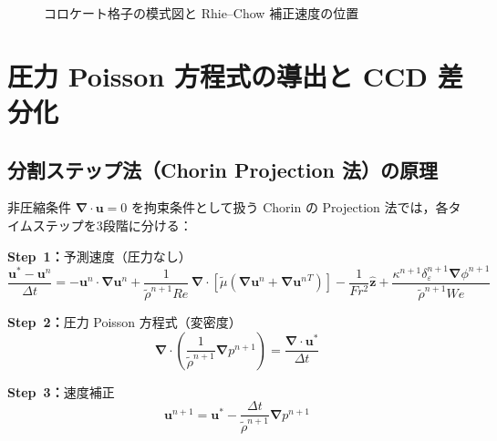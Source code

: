 \documentclass[12pt, a4paper, titlepage]{article}
\newcommand{\jp}[1]{{\normalfont\jpfont #1}}
\newcommand{\bu}{\bm{u}}
\newcommand{\bnabla}{\bm{\nabla}}
\newcommand{\de}{\delta_\varepsilon}
\begin{document}
\begin{figure}[h]
\centering
{}
\caption{\jp{コロケート格子の模式図と Rhie--Chow 補正速度の位置}}
\label{fig:collocate}
\end{figure}


\section{\jp{圧力 Poisson 方程式の導出と CCD 差分化}}
\label{sec:pressure}

\subsection{\jp{分割ステップ法（Chorin Projection 法）の原理}}

\jp{非圧縮条件 $\bnabla\cdot\bu = 0$ を拘束条件として扱う Chorin \cite{Chorin1968} の
Projection 法では，各タイムステップを3段階に分ける：}

\begin{tcolorbox}[algbox, title={\jp{Projection 法の3段階}}]
\textbf{Step~1\jp{：}}\jp{予測速度（圧力なし）}
\begin{equation}
  \frac{\bu^* - \bu^n}{\Delta t}
  = -\bu^n\cdot\bnabla\bu^n
  + \frac{1}{\tilde{\rho}^{n+1} Re}\,\bnabla\cdot\!\left[\tilde{\mu}\!\left(\bnabla\bu^n + \bnabla{\bu^n}^T\right)\right]
  - \frac{1}{Fr^2}\hat{\bm{z}}
  + \frac{\kappa^{n+1}\de^{n+1}\bnabla\phi^{n+1}}{\tilde{\rho}^{n+1} We}
  \label{eq:predictor}
\end{equation}

\textbf{Step~2\jp{：}}\jp{圧力 Poisson 方程式（変密度）}
\begin{equation}
  \bnabla\cdot\!\left(\frac{1}{\tilde{\rho}^{n+1}}\bnabla p^{n+1}\right)
  = \frac{\bnabla\cdot\bu^*}{\Delta t}
  \label{eq:PPE_operator}
\end{equation}

\textbf{Step~3\jp{：}}\jp{速度補正}
\begin{equation}
  \bu^{n+1} = \bu^* - \frac{\Delta t}{\tilde{\rho}^{n+1}}\bnabla p^{n+1}
  \label{eq:corrector}
\end{equation}
\end{tcolorbox}
\end{document}
